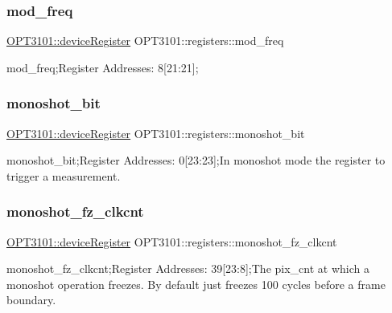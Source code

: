 \subsubsection{\texorpdfstring{mod\+\_\+freq}{mod\_freq}}
{\footnotesize\ttfamily \mbox{\hyperlink{class_o_p_t3101_1_1device_register}{O\+P\+T3101\+::device\+Register}} O\+P\+T3101\+::registers\+::mod\+\_\+freq}



mod\+\_\+freq;Register Addresses\+: 8\mbox{[}21\+:21\mbox{]}; 

\mbox{\label{class_o_p_t3101_1_1registers_a158b270484e2829a304f13e30dec3390}} 
\subsubsection{\texorpdfstring{monoshot\+\_\+bit}{monoshot\_bit}}
{\footnotesize\ttfamily \mbox{\hyperlink{class_o_p_t3101_1_1device_register}{O\+P\+T3101\+::device\+Register}} O\+P\+T3101\+::registers\+::monoshot\+\_\+bit}



monoshot\+\_\+bit;Register Addresses\+: 0\mbox{[}23\+:23\mbox{]};In monoshot mode the register to trigger a measurement. 

\mbox{\label{class_o_p_t3101_1_1registers_a7e608b657646a90dd8dfdc3dff0047fb}} 
\subsubsection{\texorpdfstring{monoshot\+\_\+fz\+\_\+clkcnt}{monoshot\_fz\_clkcnt}}
{\footnotesize\ttfamily \mbox{\hyperlink{class_o_p_t3101_1_1device_register}{O\+P\+T3101\+::device\+Register}} O\+P\+T3101\+::registers\+::monoshot\+\_\+fz\+\_\+clkcnt}



monoshot\+\_\+fz\+\_\+clkcnt;Register Addresses\+: 39\mbox{[}23\+:8\mbox{]};The pix\+\_\+cnt at which a monoshot operation freezes. By default just freezes 100 cycles before a frame boundary. 


